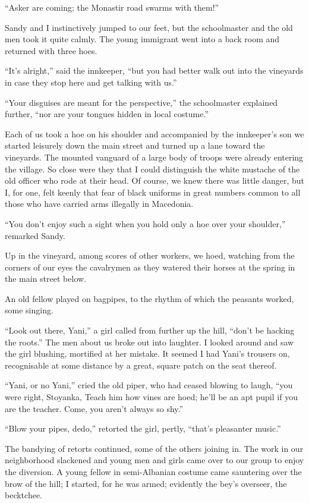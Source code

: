 \documentclass[a5paper,12pt]{book}
\begin{document}
“Asker are coming; the Monastir road swarms with them!”

Sandy and I instinctively jumped to our feet, but the schoolmaster and the old men took it quite calmly. The young immigrant went into a back room and returned with three hoes.

“It’s alright,” said the innkeeper, “but you had better walk out into the vineyards in case they stop here and get talking with us.”

“Your disguises are meant for the perspective,” the schoolmaster explained further, “nor are your tongues hidden in local costume.”

Each of us took a hoe on his shoulder and accompanied by the innkeeper’s son we started leisurely down the main street and turned up a lane toward the vineyards. The mounted vanguard of a large body of troops were already entering the village. So close were they that I could distinguish the white mustache of the old officer who rode at their head. Of course, we knew there was little danger, but I, for one, felt keenly that fear of black uniforms in great numbers common to all those who have carried arms illegally in Macedonia.

“You don’t enjoy such a sight when you hold only a hoe over your shoulder,” remarked Sandy.

Up in the vineyard, among scores of other workers, we hoed, watching from the corners of our eyes the cavalrymen as they watered their horses at the spring in the main street below.

An old fellow played on bagpipes, to the rhythm of which the peasants worked, some singing.

“Look out there, Yani,” a girl called from further up the hill, “don’t be hacking the roots.” The men about us broke out into laughter. I looked around and saw the girl blushing, mortified at her mistake. It seemed I had Yani’s trousers on, recognisable at some distance by a great, square patch on the seat thereof.

“Yani, or no Yani,” cried the old piper, who had ceased blowing to laugh, “you were right, Stoyanka, Teach him how vines are hoed; he’ll be an apt pupil if you are the teacher. Come, you aren’t always so shy.”

“Blow your pipes, dedo,” retorted the girl, pertly, “that’s pleasanter music.”

The bandying of retorts continued, some of the others joining in. The work in our neighborhood slackened and young men and girls came over to our group to enjoy the diversion. A young fellow in semi-Albanian costume came sauntering over the brow of the hill; I started, for he was armed; evidently the bey’s overseer, the becktchee.
\end{document}

